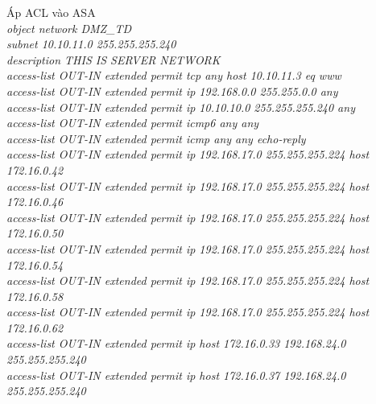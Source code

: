 \documentclass[a4paper, 12pt]{article}
\begin{document}
\hspace*{1cm}Áp ACL vào ASA\\
\hspace*{1cm}\textit{object network DMZ\_TD\\
\hspace*{1cm}subnet 10.10.11.0 255.255.255.240\\
\hspace*{1cm}description THIS IS SERVER NETWORK\\
\hspace*{1cm}access-list OUT-IN extended permit tcp any host 10.10.11.3 eq www\\
\hspace*{1cm}access-list OUT-IN extended permit ip 192.168.0.0 255.255.0.0 any\\
\hspace*{1cm}access-list OUT-IN extended permit ip 10.10.10.0 255.255.255.240 any\\
\hspace*{1cm}access-list OUT-IN extended permit icmp6 any any\\
\hspace*{1cm}access-list OUT-IN extended permit icmp any any echo-reply\\
\hspace*{1cm}access-list OUT-IN extended permit ip 192.168.17.0 255.255.255.224 host 172.16.0.42\\
\hspace*{1cm}access-list OUT-IN extended permit ip 192.168.17.0 255.255.255.224 host 172.16.0.46\\
\hspace*{1cm}access-list OUT-IN extended permit ip 192.168.17.0 255.255.255.224 host 172.16.0.50\\
\hspace*{1cm}access-list OUT-IN extended permit ip 192.168.17.0 255.255.255.224 host 172.16.0.54\\
\hspace*{1cm}access-list OUT-IN extended permit ip 192.168.17.0 255.255.255.224 host 172.16.0.58\\
\hspace*{1cm}access-list OUT-IN extended permit ip 192.168.17.0 255.255.255.224 host 172.16.0.62\\
\hspace*{1cm}access-list OUT-IN extended permit ip host 172.16.0.33 192.168.24.0 255.255.255.240\\
\hspace*{1cm}access-list OUT-IN extended permit ip host 172.16.0.37 192.168.24.0 255.255.255.240\\
}
\end{document}
